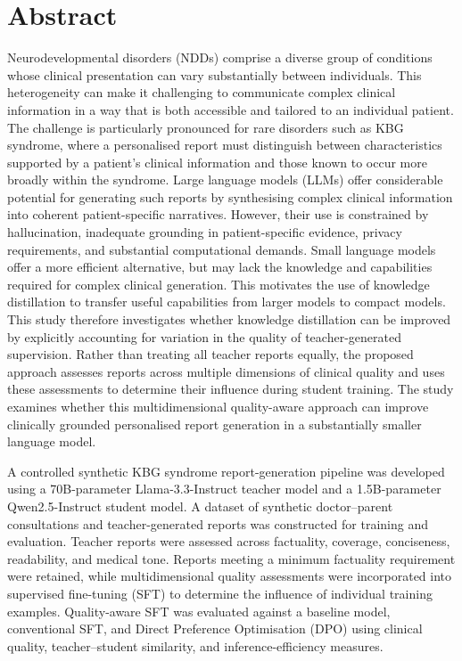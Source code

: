 \documentclass[ %
                    author={Aman Kumar Singh},
                supervisor={Dr. Edwin Simpson},
                    degree={MSc},
                     title={Quality-Aware Knowledge Distillation of Large Language Models for Efficient Personalised Clinical Report Generation},
                  subtitle={},
                      type={},
                      year={2021}]{dissertation}
\begin{document}
\chapter*{Abstract}
Neurodevelopmental disorders (NDDs) comprise a diverse group of conditions
whose clinical presentation can vary substantially between individuals. This
heterogeneity can make it challenging to communicate complex clinical
information in a way that is both accessible and tailored to an individual
patient. The challenge is particularly pronounced for rare disorders such as
KBG syndrome, where a personalised report must distinguish between
characteristics supported by a patient's clinical information and those known
to occur more broadly within the syndrome. Large language models (LLMs) offer
considerable potential for generating such reports by synthesising complex
clinical information into coherent patient-specific narratives. However, their
use is constrained by hallucination, inadequate grounding in patient-specific
evidence, privacy requirements, and substantial computational demands. Small
language models offer a more efficient alternative, but may lack the knowledge
and capabilities required for complex clinical generation. This motivates the
use of knowledge distillation to transfer useful capabilities from larger
models to compact models. This study
therefore investigates whether knowledge distillation can be improved by
explicitly accounting for variation in the quality of teacher-generated
supervision. Rather than treating all teacher reports equally, the proposed
approach assesses reports across multiple dimensions of clinical quality and
uses these assessments to determine their influence during student training.
The study examines whether this multidimensional quality-aware approach can
improve clinically grounded personalised report generation in a substantially
smaller language model.

A controlled synthetic KBG syndrome report-generation pipeline was developed
using a 70B-parameter Llama-3.3-Instruct teacher model and a 1.5B-parameter
Qwen2.5-Instruct student model. A dataset of synthetic doctor--parent
consultations and teacher-generated reports was constructed for training and
evaluation. Teacher reports were assessed across factuality, coverage,
conciseness, readability, and medical tone. Reports meeting a minimum
factuality requirement were retained, while multidimensional quality
assessments were incorporated into supervised fine-tuning (SFT) to determine
the influence of individual training examples. Quality-aware SFT was evaluated
against a baseline model, conventional SFT, and Direct Preference Optimisation
(DPO) using clinical quality, teacher--student similarity, and
inference-efficiency measures.
\end{document}
